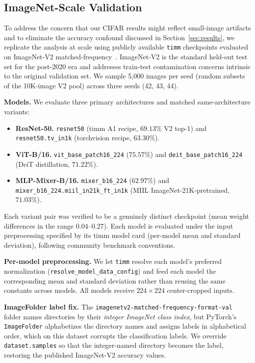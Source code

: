 \documentclass{article}
\begin{document}
\subsection{ImageNet-Scale Validation}
\label{sec:imagenet}

To address the concern that our CIFAR results might reflect small-image artifacts and to eliminate the accuracy confound discussed in Section~\ref{sec:results}, we replicate the analysis at scale using publicly available \texttt{timm} checkpoints evaluated on ImageNet-V2 matched-frequency~\citep{recht2019imagenet}. ImageNet-V2 is the standard held-out test set for the post-2020 era and addresses train-test contamination concerns intrinsic to the original validation set. We sample 5{,}000 images per seed (random subsets of the 10K-image V2 pool) across three seeds (42, 43, 44).

\textbf{Models.} We evaluate three primary architectures and matched same-architecture variants:
\begin{itemize}
    \item \textbf{ResNet-50.} \texttt{resnet50} (timm A1 recipe, $69.13\%$ V2 top-1) and \texttt{resnet50.tv\_in1k} (torchvision recipe, $63.30\%$).
    \item \textbf{ViT-B/16.} \texttt{vit\_base\_patch16\_224} ($75.57\%$) and \texttt{deit\_base\_patch16\_224} (DeiT distillation, $71.22\%$).
    \item \textbf{MLP-Mixer-B/16.} \texttt{mixer\_b16\_224} ($62.97\%$) and \texttt{mixer\_b16\_224.miil\_in21k\_ft\_in1k} (MIIL ImageNet-21K-pretrained, $71.03\%$).
\end{itemize}

Each variant pair was verified to be a genuinely distinct checkpoint (mean weight differences in the range $0.04$--$0.27$). Each model is evaluated under the input preprocessing specified by its timm model card (per-model mean and standard deviation), following community benchmark conventions.

\textbf{Per-model preprocessing.} We let \texttt{timm} resolve each model's preferred normalization (\texttt{resolve\_model\_data\_config}) and feed each model the corresponding mean and standard deviation rather than reusing the same constants across models. All models receive $224 \times 224$ center-cropped inputs.

\textbf{ImageFolder label fix.} The \texttt{imagenetv2-matched-frequency-format-val} folder names directories by their \emph{integer ImageNet class index}, but PyTorch's \texttt{ImageFolder} alphabetizes the directory names and assigns labels in alphabetical order, which on this dataset corrupts the classification labels. We override \texttt{dataset.samples} so that the integer-named directory becomes the label, restoring the published ImageNet-V2 accuracy values.
\end{document}
